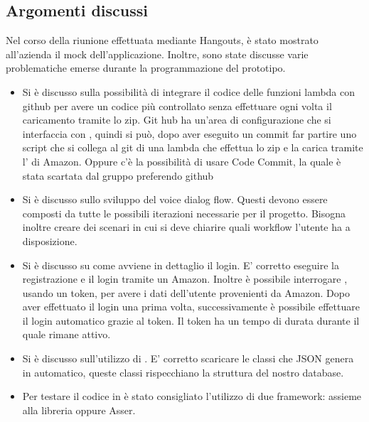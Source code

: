 \documentclass[a4paper,12pt]{article}
\begin{document}
	\subsection{Argomenti discussi}
	Nel corso della riunione effettuata mediante Hangouts, è stato mostrato all'azienda il mock dell'applicazione.  
	Inoltre, sono state discusse varie problematiche emerse durante la programmazione del prototipo.
	\begin{itemize}
		\item {Si è discusso sulla possibilità di integrare il codice delle funzioni lambda con github per avere un codice più controllato senza effettuare ogni volta il caricamento tramite lo zip. Git hub ha  un'area di configurazione che si interfaccia con , quindi si può, dopo aver eseguito un commit far partire uno script che si collega al git di una lambda che effettua lo zip e la carica tramite l' di Amazon. Oppure c'è la possibilità di usare Code Commit, la quale è stata scartata dal gruppo preferendo github}
		\item {Si è discusso sullo sviluppo del voice dialog flow. Questi devono essere composti da tutte le possibili iterazioni necessarie per il progetto. Bisogna inoltre creare dei scenari in cui si deve chiarire quali workflow l'utente ha a disposizione.}
		\item {Si è discusso su come avviene in dettaglio il login. E' corretto eseguire la registrazione e il login tramite un  Amazon. Inoltre è possibile interrogare , usando un token, per avere i dati dell'utente provenienti da Amazon. Dopo aver effettuato il login una prima volta, successivamente è possibile effettuare il login automatico grazie al token. Il token ha un tempo di durata durante il quale rimane attivo.}
		\item {Si è discusso sull'utilizzo di . E' corretto scaricare le classi che JSON genera in automatico, queste classi rispecchiano la struttura del nostro database.}
		\item {Per testare il codice in  è stato consigliato l'utilizzo di due framework:  assieme alla libreria  oppure Asser.}
	\end{itemize}
\end{document}
